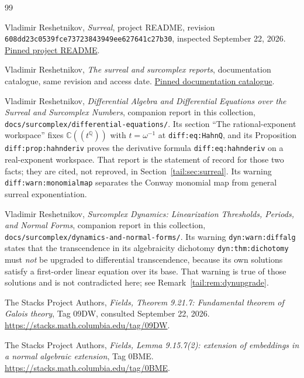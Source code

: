 \documentclass[11pt,a4paper]{article}
\numberwithin{equation}{section}
\theoremstyle{definition}
\theoremstyle{remark}
\newcommand{\C}{\mathbb C}
\newcommand{\Q}{\mathbb Q}
\newcommand{\repocommit}{608dd23c0539fce73723843949ee627641c27b30}
\begin{document}
{}
\begin{thebibliography}{99}
\small\raggedright
\setlength{\itemsep}{3pt}
Vladimir Reshetnikov, \emph{Surreal}, project README, revision
\texttt{\repocommit}, inspected September 22, 2026.
\href{https://github.com/VladimirReshetnikov/Surreal/blob/608dd23c0539fce73723843949ee627641c27b30/README.md}{Pinned project README}.

Vladimir Reshetnikov, \emph{The surreal and surcomplex reports},
documentation catalogue, same revision and access date.
\href{https://github.com/VladimirReshetnikov/Surreal/blob/608dd23c0539fce73723843949ee627641c27b30/docs/README.md}{Pinned documentation catalogue}.

Vladimir Reshetnikov, \emph{Differential Algebra and Differential Equations
over the Surreal and Surcomplex Numbers}, companion report in this
collection, \texttt{docs/surcomplex/differential-equations/}.
Its section ``The rational-exponent workspace'' fixes
$\C((t^\Q))$ with $t=\omega^{-1}$ at \texttt{diff:eq:HahnQ}, and its
Proposition \texttt{diff:prop:hahnderiv} proves the derivative formula
\texttt{diff:eq:hahnderiv} on a real-exponent workspace. That report is
the statement of record for those two facts; they are cited, not reproved,
in Section~\ref{tail:sec:surreal}. Its warning
\texttt{diff:warn:monomialmap} separates the Conway monomial map from
general surreal exponentiation.

Vladimir Reshetnikov, \emph{Surcomplex Dynamics: Linearization Thresholds,
Periods, and Normal Forms}, companion report in this collection,
\texttt{docs/surcomplex/dynamics-and-normal-forms/}.
Its warning \texttt{dyn:warn:diffalg} states that the transcendence in its
algebraicity dichotomy \texttt{dyn:thm:dichotomy} must \emph{not} be
upgraded to differential transcendence, because its own solutions satisfy a
first-order linear equation over its base. That warning is true of those
solutions and is not contradicted here; see
Remark~\ref{tail:rem:dynupgrade}.

The Stacks Project Authors, \emph{Fields, Theorem 9.21.7: Fundamental theorem of Galois theory},
Tag 09DW, consulted September 22, 2026.
\url{https://stacks.math.columbia.edu/tag/09DW}.

The Stacks Project Authors, \emph{Fields, Lemma 9.15.7(2): extension of
embeddings in a normal algebraic extension}, Tag 0BME.
\url{https://stacks.math.columbia.edu/tag/0BME}.


\end{thebibliography}
\end{document}
